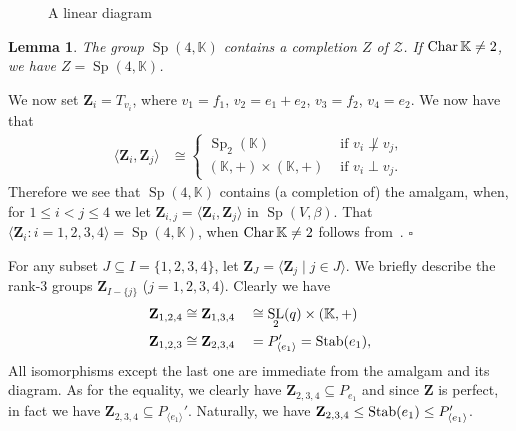 \documentclass[12pt]{amsart}
\newtheorem{lemma}[theorem]{Lemma}
\theoremstyle{definition}
\newcommand{\bpf}{\noindent{\bf Proof}\hspace{7pt}}
\newcommand{\epf}{\qed}
\newcommand{\ble}{\begin{lemma}}
\newcommand{\ele}{\end{lemma}}
\newcommand{\sbe}{\subseteq}
\def\flexbox#1{\mathchoice{\mbox{#1}}{\mbox{#1}}{\mbox{\scriptsize #1}}%
{\mbox{\tiny #1}}}
\DeclareMathOperator{\SL}{SL}
\newcommand{\Char}{\mathop{\flexbox{\rm Char}}}
\newcommand{\KK}{{\mathbb K}}
\DeclareMathOperator{\Sp}{Sp}
\newcommand{\Stab}{\mathop{\rm Stab}}
\renewcommand{\qed}{\hfill $\square$}
\newcommand{\amgrpZ}{{\mathbf{Z}}}
\newcommand{\compZ}{{{Z}}}
\newcommand{\amZ}{{\mathscr{Z}}}
\begin{document}
\begin{figure}[h]
\caption{A linear diagram}\label{fig:Z diagram}
\end{figure}
\ble
The group $\Sp(4,\KK)$ contains a completion $\compZ$ of $\amZ$.
If $\Char \KK\ne 2$, we have $\compZ=\Sp(4,\KK)$.
\ele
\bpf
We now set $\amgrpZ_i=T_{v_i}$, where 
$v_1 = {f_1}$, $v_2 = {e_1+e_2}$, $
v_3  = {f_2}$, $v_4= {e_2}$.
We now have that 
\begin{align*}
\langle \amgrpZ_i,\amgrpZ_j\rangle &\cong
\begin{cases} 
\Sp_2(\KK) & \mbox{ if } v_i\not\perp v_j,\\
(\KK,+)\times (\KK,+) & \mbox{ if } v_i\perp v_j.
\end{cases}
\end{align*}
Therefore we see that $\Sp(4,\KK)$ contains (a completion of) the amalgam, when, for $1\le i<j\le 4$ we let $\amgrpZ_{i,j}=\langle \amgrpZ_i,\amgrpZ_j\rangle$ in $\Sp(V,\beta)$.
That $\langle \amgrpZ_i\colon i=1,2,3,4\rangle=\Sp(4,\KK)$, when $\Char \KK\ne 2$ follows from~\cite{Bl2007}.
\epf

For any subset $J\sbe I=\{1,2,3,4\}$, let $\amgrpZ_J=\langle \amgrpZ_j\mid j\in J\rangle$.
We briefly describe the rank-$3$ groups $\amgrpZ_{I-\{j\}}$ ($j=1,2,3,4$).
Clearly we have 
\begin{alignat*}{2}
\amgrpZ_{1,2,4 }& \cong \amgrpZ_{1,3,4} && \cong \SL_2(q)\times (\KK,+)\\
\amgrpZ_{1,2,3} & \cong\amgrpZ_{2,3,4} &&= P_{\langle e_1\rangle}'=\Stab(e_1),
\end{alignat*}
All isomorphisms except the last one are immediate from the amalgam and its diagram.
As for the equality, we clearly have $\amgrpZ_{2,3,4}\sbe P_{e_1}$ and since $\amgrpZ$ is perfect, in fact we have $\amgrpZ_{2,3,4}\sbe P_{\langle e_1\rangle}'$. Naturally, we have 
 $\amgrpZ_{2,3,4}\le \Stab(e_1)\le P_{\langle e_1\rangle}'$.
\end{document}
